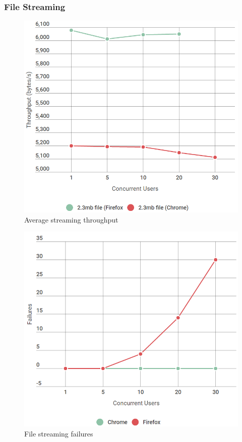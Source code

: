 \documentclass[]{report}
\begin{document}
			\subsubsection{File Streaming}
			\begin{figure}[H]
				\caption{Average streaming throughput}
				\centering
				\includegraphics[scale=0.45]{streaming-chart.png}
			\end{figure}
			\begin{figure}[H]
				\caption{File streaming failures}
				\centering
				\includegraphics[scale=0.45]{stream-failures-chart.png}
			\end{figure}
			
\end{document}
